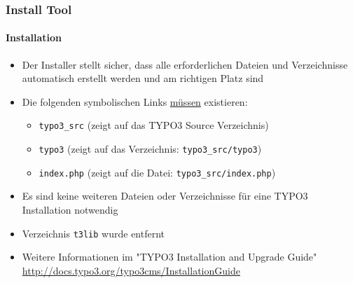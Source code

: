 
\begin{frame}[fragile]

	\frametitle{Install Tool}
	\framesubtitle{Installation}

	\begin{itemize}
		\item Der Installer stellt sicher, dass alle erforderlichen Dateien und Verzeichnisse automatisch erstellt werden und am richtigen Platz sind
		\item Die folgenden symbolischen Links \underline{müssen} existieren:

		\begin{itemize}
			\item \texttt{typo3\_src}	\tabto{2cm} (zeigt auf das TYPO3 Source Verzeichnis)
			\item \texttt{typo3}		\tabto{2cm} (zeigt auf das Verzeichnis: \texttt{typo3\_src/typo3})
			\item \texttt{index.php}	\tabto{2cm} (zeigt auf die Datei: \texttt{typo3\_src/index.php})
		\end{itemize}

		\item Es sind keine weiteren Dateien oder Verzeichnisse für eine TYPO3 Installation notwendig
		\item Verzeichnis \texttt{t3lib} wurde entfernt
		\item Weitere Informationen im "TYPO3 Installation and Upgrade Guide"\newline
			\url{http://docs.typo3.org/typo3cms/InstallationGuide}

	\end{itemize}

\end{frame}


